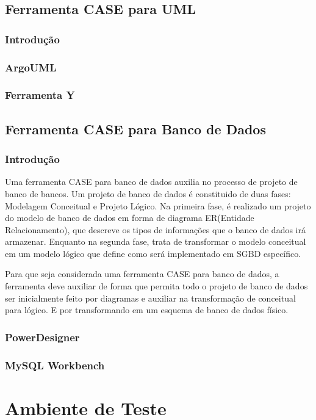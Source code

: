 \documentclass[12pt,a4paper]{article}
\begin{document}
	\subsection{Ferramenta CASE para UML}
		\subsubsection{Introdução}
		\subsubsection{ArgoUML}
		\subsubsection{Ferramenta Y}

	\subsection{Ferramenta CASE para Banco de Dados}
		\subsubsection{Introdução}
			Uma ferramenta CASE para banco de dados auxilia no processo de projeto de banco de bancos. Um projeto de banco de
			dados é constituido de duas fases: Modelagem Conceitual e Projeto Lógico. Na primeira fase, é realizado um projeto do
			modelo de banco de dados em forma de diagrama ER(Entidade Relacionamento), que descreve os tipos de informações que o
			banco de dados irá armazenar. Enquanto na segunda fase, trata de transformar o modelo conceitual em um modelo lógico
			que define como será implementado em SGBD específico.
			
			Para que seja considerada uma ferramenta CASE para banco de dados, a ferramenta deve auxiliar de forma que permita
			todo o projeto de banco de dados ser inicialmente feito por diagramas e auxiliar na transformação de conceitual para
			lógico. E por transformando em um esquema de banco de dados físico.
		\subsubsection{PowerDesigner}
		\subsubsection{MySQL Workbench}
		
\clearpage
\section{Ambiente de Teste}
\end{document}

